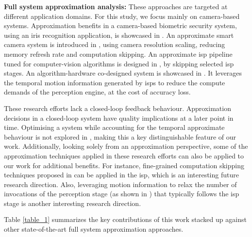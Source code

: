 \noindent
\textbf{Full system approximation analysis: }These approaches are targeted at different application domains. For this study, we focus mainly on camera-based systems. Approximation benefits in a camera-based biometric security system, using an iris recognition application, is showcased in \cite{8342029}. An approximate smart camera system is introduced in \cite{araha}, using camera resolution scaling, reducing memory refresh rate and computation skipping. An approximate \gls{isp} pipeline tuned for computer-vision algorithms is designed in \cite{buckler}, by skipping selected \gls{isp} stages. An algorithm-hardware co-designed system is showcased in \cite{euphrates}. It leverages the temporal motion information generated by \glspl{isp} to reduce the compute demands of the perception engine, at the cost of accuracy loss.

\par These research efforts \cite{8342029, araha, buckler, euphrates} lack a closed-loop feedback behaviour. Approximation decisions in a closed-loop system have quality implications at a later point in time. Optimising a system while accounting for the temporal approximate behaviour is not explored in \cite{8342029, araha, buckler, euphrates}, making this a key distinguishable feature of our work. Additionally, looking solely from an approximation perspective, some of the approximation techniques applied in these research efforts can also be applied to our work for additional benefits. For instance, fine-grained computation skipping techniques proposed in \cite{araha, rnr} can be applied in the \gls{isp}, which is an interesting future research direction. Also, leveraging motion information to relax the number of invocations of the perception stage (as shown in \cite{euphrates}) that typically follows the \gls{isp} stage is another interesting research direction.

Table \ref{table_1} summarizes the key contributions of this work stacked up against other state-of-the-art full system approximation approaches.

